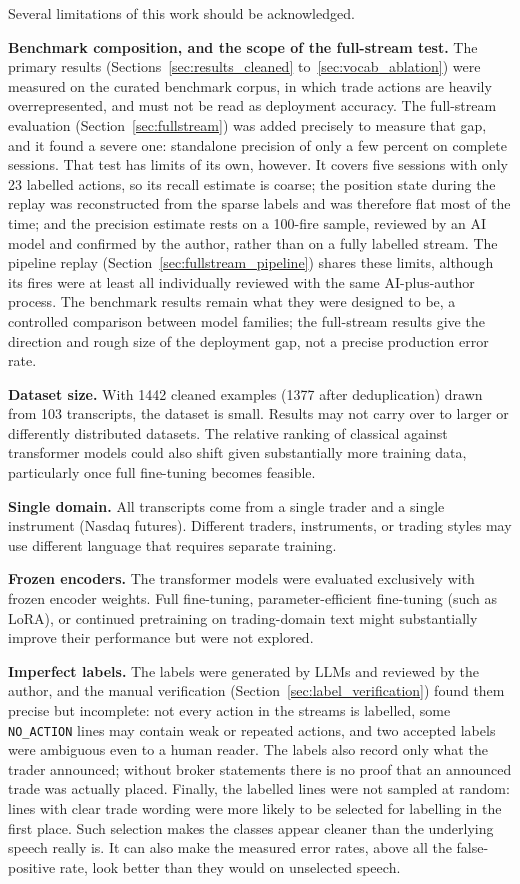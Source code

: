 Several limitations of this work should be acknowledged.

\textbf{Benchmark composition, and the scope of the full-stream test.} The primary results (Sections~\ref{sec:results_cleaned} to~\ref{sec:vocab_ablation}) were measured on the curated benchmark corpus, in which trade actions are heavily overrepresented, and must not be read as deployment accuracy. The full-stream evaluation (Section~\ref{sec:fullstream}) was added precisely to measure that gap, and it found a severe one: standalone precision of only a few percent on complete sessions. That test has limits of its own, however. It covers five sessions with only 23 labelled actions, so its recall estimate is coarse; the position state during the replay was reconstructed from the sparse labels and was therefore flat most of the time; and the precision estimate rests on a 100-fire sample, reviewed by an AI model and confirmed by the author, rather than on a fully labelled stream. The pipeline replay (Section~\ref{sec:fullstream_pipeline}) shares these limits, although its fires were at least all individually reviewed with the same AI-plus-author process. The benchmark results remain what they were designed to be, a controlled comparison between model families; the full-stream results give the direction and rough size of the deployment gap, not a precise production error rate.

\textbf{Dataset size.} With 1442 cleaned examples (1377 after deduplication) drawn from 103 transcripts, the dataset is small. Results may not carry over to larger or differently distributed datasets. The relative ranking of classical against transformer models could also shift given substantially more training data, particularly once full fine-tuning becomes feasible.

\textbf{Single domain.} All transcripts come from a single trader and a single instrument (Nasdaq futures). Different traders, instruments, or trading styles may use different language that requires separate training.

\textbf{Frozen encoders.} The transformer models were evaluated exclusively with frozen encoder weights. Full fine-tuning, parameter-efficient fine-tuning (such as LoRA), or continued pretraining on trading-domain text might substantially improve their performance but were not explored.

\textbf{Imperfect labels.} The labels were generated by LLMs and reviewed by the author, and the manual verification (Section~\ref{sec:label_verification}) found them precise but incomplete: not every action in the streams is labelled, some \texttt{NO\_ACTION} lines may contain weak or repeated actions, and two accepted labels were ambiguous even to a human reader. The labels also record only what the trader announced; without broker statements there is no proof that an announced trade was actually placed. Finally, the labelled lines were not sampled at random: lines with clear trade wording were more likely to be selected for labelling in the first place. Such selection makes the classes appear cleaner than the underlying speech really is. It can also make the measured error rates, above all the false-positive rate, look better than they would on unselected speech.

